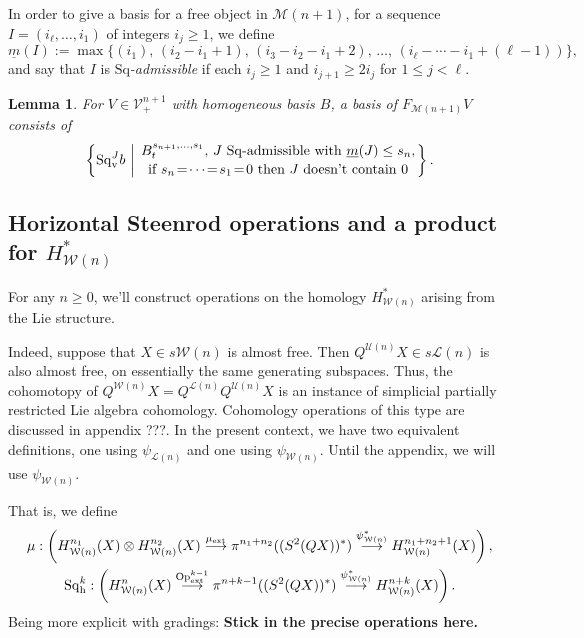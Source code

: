 \documentclass[11pt]{amsart}
\theoremstyle{plain}
\newtheorem{lem}[thm]{Lemma}
\theoremstyle{definition}
\renewcommand{\to}{\longrightarrow}
\newcommand{\calW}{\mathcal{W}}
\newcommand{\calU}{\mathcal{U}}
\newcommand{\calL}{\mathcal{L}}
\newcommand{\calV}{\mathcal{V}}
\newcommand{\calM}{\mathcal{M}}
\theoremstyle{plain}
\newcommand{\vect}[2]{\calV^{#1}_{#2}}
\newcommand{\ExtCohOp}{\textup{Op}_\textup{ext}}
\newcommand{\ExtCohProd}{\mu_\textup{ext}}
\newcommand{\minDimSq}{\underline{m}}
\newcommand{\Sq}{\mathrm{Sq}}
\begin{document}
\begin{Cohomology operations for all unstable Lie algebras}
In order to give a basis for a free object in $\calM(n+1)$, for a sequence $I=(i_\ell,\ldots,i_1)$ of integers $i_j\geq1$, we define
\[\minDimSq(I):=\max\{(i_1),\,(i_2-i_1+1),\,(i_3-i_2-i_1+2),\,\ldots,\,(i_{\ell}-\cdots-i_1+(\ell-1))\},
\]
and say that $I$ is \emph{$\Sq$-admissible} if each $i_j\geq1$ and $i_{j+1}\geq 2i_j$ for $1\leq j <\ell$.
\begin{lem}
For $V\in\vect{n+1}{+}$ with homogeneous basis $B$, a basis of $F_{\calM(n+1)}V$ consists of
\[\left\{\Sq^J_{\textup{v}}b\ \middle|\ \genfrac{}{}{0pt}{}{B^{s_{n+1},\ldots,s_1}_t\textup{, $J$ $\Sq$-admissible with }\minDimSq(J)\leq s_n,}{\textup{if }s_{n}\!=\!\cdots\!=\!s_1\!=\!0\textup{ then $J$ doesn't contain 0}}\right\}.\]


\end{lem}

\subsection{Horizontal Steenrod operations and a product for $H^*_{\calW(n)}$}
For any $n\geq 0$, we'll construct operations on the homology $H^*_{\calW(n)}$ arising from the Lie structure.

Indeed, suppose that $X\in s\calW(n)$ is almost free. Then $Q^{\calU(n)}X\in s\calL(n)$ is also almost free, on essentially the same generating subspaces. Thus, the cohomotopy of $Q^{\calW(n)}X=Q^{\calL(n)}Q^{\calU(n)}X$ is an instance of simplicial partially restricted Lie algebra cohomology. Cohomology operations of this type are discussed in appendix ???. In the present context, we have two equivalent definitions, one using $\psi_{\calL(n)}$ and one using $\psi_{\calW(n)}$. Until the appendix, we will use $\psi_{\calW(n)}$.

That is, we define
\begin{gather*}
\mu:\left(H_{\calW(n)}^{n_1}(X)\otimes H_{\calW(n)}^{n_2}(X)\overset{\ExtCohProd}{\to} \pi^{n_1+n_2}((S^2(QX))^*)\overset{\psi_{\calW(n)}^*}{\to} H_{\calW(n)}^{n_1+n_2+1}(X)\right),\\
\Sq^k_\textup{h}:\left(H_{\calW(n)}^{n}(X)\overset{\ExtCohOp^{k-1}}{\to} \pi^{n+k-1}((S^2(QX))^*)\overset{\psi_{\calW(n)}^*}{\to} H_{\calW(n)}^{n+k}(X)\right).
\end{gather*}
Being more explicit with gradings:
\textbf{Stick in the precise operations here.}


\end{Cohomology operations for all unstable Lie algebras}
\end{document}
